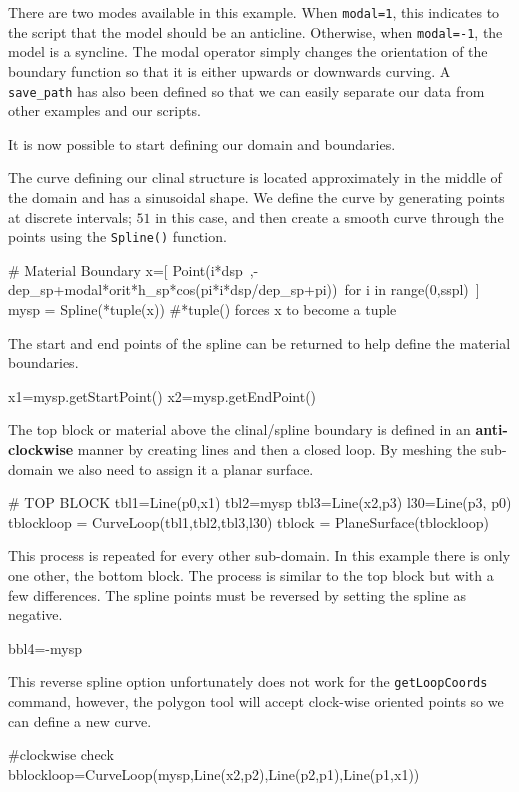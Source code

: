 There are two modes available in this example. When \verb|modal=1|, this
indicates to the script that the model should be an anticline. Otherwise, when
\verb|modal=-1|, the model is a syncline. The modal operator simply changes the
orientation of the boundary function so that it is either upwards or downwards
curving. A \verb|save_path| has also been defined so that we can easily separate
our data from other examples and our scripts. 

It is now possible to start defining our domain and boundaries. 

The curve defining our clinal structure is located approximately in the middle
of the domain and has a sinusoidal shape. We define the curve by generating
points at discrete intervals; $51$ in this case, and then create a smooth curve
through the points using the \verb|Spline()| function.
\begin{python}
# Material Boundary
x=[ Point(i*dsp\
    ,-dep_sp+modal*orit*h_sp*cos(pi*i*dsp/dep_sp+pi))\
     for i in range(0,sspl)\
    ]
mysp = Spline(*tuple(x)) #*tuple() forces x to become a tuple
\end{python}
The start and end points of the spline can be returned to help define the
material boundaries.
\begin{python}
x1=mysp.getStartPoint()
x2=mysp.getEndPoint()
\end{python}
The top block or material above the clinal/spline boundary is defined in an
\textbf{anti-clockwise} manner by creating lines and then a closed loop. By
meshing the sub-domain we also need to assign it a planar surface. 
\begin{python}
# TOP BLOCK
tbl1=Line(p0,x1)
tbl2=mysp
tbl3=Line(x2,p3)
l30=Line(p3, p0)
tblockloop = CurveLoop(tbl1,tbl2,tbl3,l30)
tblock = PlaneSurface(tblockloop)
\end{python}
This process is repeated for every other sub-domain. In this example there is
only one other, the bottom block. The process is similar to the top block but
with a few differences. The spline points must be reversed by setting the spline
as negative.
\begin{python}
bbl4=-mysp
\end{python}
This reverse spline option unfortunately does not work for the
\verb|getLoopCoords| command, however, the \modmpl polygon tool will accept
clock-wise oriented points so we can define a new curve.
\begin{python}
#clockwise check
bblockloop=CurveLoop(mysp,Line(x2,p2),Line(p2,p1),Line(p1,x1))
\end{python}
